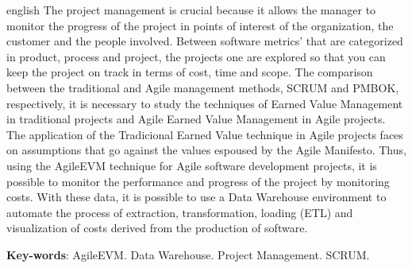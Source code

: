 \begin{resumo}[Abstract]
 \begin{otherlanguage*}{english}
The project management is crucial because it allows the manager to monitor the progress of the project in points of interest of the organization, the customer and the people involved. Between software metrics’ that are categorized in product, process and project, the projects one are explored so that you can keep the project on track in terms of cost, time and scope. The comparison between the traditional and Agile management methods, SCRUM and PMBOK, respectively, it is necessary to study the techniques of Earned Value Management in traditional projects and Agile Earned Value Management in Agile projects. The application of the Tradicional Earned Value technique in Agile projects faces on assumptions that go against the values espoused by the Agile Manifesto. Thus, using the AgileEVM technique for Agile software development projects, it is possible to monitor the performance and progress of the project by monitoring costs. With these data, it is possible to use a Data Warehouse environment to automate the process of extraction, transformation, loading (ETL) and visualization of costs derived from the production of software.

   \vspace{\onelineskip}
 
   \noindent 
   \textbf{Key-words}: AgileEVM. Data Warehouse. Project Management. SCRUM.
 \end{otherlanguage*}
\end{resumo}
